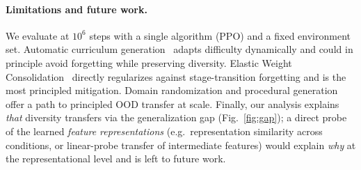 \documentclass{article}
\begin{document}
\paragraph{Limitations and future work.}
We evaluate at $10^6$ steps with a single algorithm (PPO) and a fixed environment set.
Automatic curriculum generation~\citep{portelas-ijcai20} adapts difficulty dynamically
and could in principle avoid forgetting while preserving diversity.
Elastic Weight Consolidation~\citep{kirkpatrick2017overcoming} directly regularizes against
stage-transition forgetting and is the most principled mitigation.
Domain randomization and procedural generation offer a path to principled OOD transfer at scale.
Finally, our analysis explains \emph{that} diversity transfers via the generalization gap
(Fig.~\ref{fig:gap}); a direct probe of the learned \emph{feature representations}
(e.g.\ representation similarity across conditions, or linear-probe transfer of intermediate
features) would explain \emph{why} at the representational level and is left to future work.

\newpage


\end{document}
